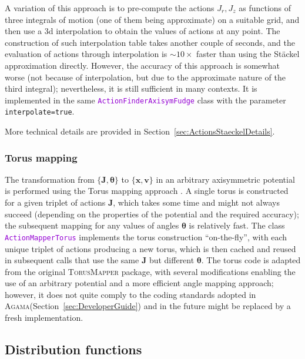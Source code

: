 \documentclass[12pt]{article}
\newcommand{\Agama}{\textsc{Agama}\xspace}
\newcommand{\ttt}[1]{\textcolor{darkviolet}{\texttt{#1}}}
\newcommand{\bv}{\boldsymbol{v}}
\newcommand{\bx}{\boldsymbol{x}}
\newcommand{\bJ}{\boldsymbol{J}}
\newcommand{\bt}{\boldsymbol{\theta}}
\begin{document}
A variation of this approach is to pre-compute the actions $J_r,J_z$ as functions of three integrals of motion (one of them being approximate) on a suitable grid, and then use a 3d interpolation to obtain the values of actions at any point. The construction of such interpolation table takes another couple of seconds, and the evaluation of actions through interpolation is $\sim 10\times$ faster than using the St\"ackel approximation directly. However, the accuracy of this approach is somewhat worse (not because of interpolation, but due to the approximate nature of the third integral); nevertheless, it is still sufficient in many contexts. It is implemented in the same \ttt{ActionFinderAxisymFudge} class with the parameter \texttt{interpolate=true}.

More technical details are provided in Section~\ref{sec:ActionsStaeckelDetails}.


\subsubsection{Torus mapping}  \label{sec:ActionsTorus}

The transformation from $\{\bJ, \bt\}$ to $\{\bx,\bv\}$ in an arbitrary axisymmetric potential is performed using the Torus mapping approach \cite{BinneyMcMillan2016}. A single torus is constructed for a given triplet of actions $\bJ$, which takes some time and might not always succeed (depending on the properties of the potential and the required accuracy); the subsequent mapping for any values of angles $\bt$ is relatively fast.
The class \ttt{ActionMapperTorus} implements the torus construction ``on-the-fly'', with each unique triplet of actions producing a new torus, which is then cached and reused in subsequent calls that use the same $\bJ$ but different $\bt$. The torus code is adapted from the original \textsc{TorusMapper} package, with several modifications enabling the use of an arbitrary potential and a more efficient angle mapping approach; however, it does not quite comply to the coding standards adopted in \Agama (Section~\ref{sec:DeveloperGuide}) and in the future might be replaced by a fresh implementation. 


\subsection{Distribution functions}  \label{sec:DF}
\end{document}
